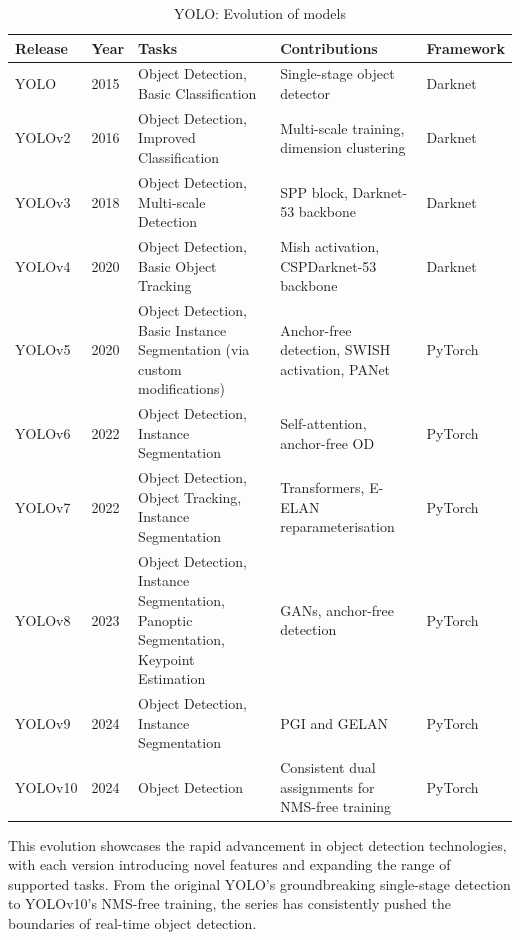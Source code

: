 \documentclass{article}
\begin{document}
\begin{table}[ht]
\centering
\caption{YOLO: Evolution of models}
\label{tab:yolo_versions}
\begin{tabular}{|l|l|p{5cm}|p{5cm}|l|}
\hline
Release & Year & Tasks & Contributions & Framework \\
\hline
YOLO \cite{redmon2016you} & 2015 & Object Detection, Basic Classification & Single-stage object detector & Darknet \\
YOLOv2 \cite{redmon2017yolo9000} & 2016 & Object Detection, Improved Classification & Multi-scale training, dimension clustering & Darknet \\
YOLOv3 \cite{redmon2018yolov3} & 2018 & Object Detection, Multi-scale Detection & SPP block, Darknet-53 backbone & Darknet \\
YOLOv4 \cite{bochkovskiy2020yolov4} & 2020 & Object Detection, Basic Object Tracking & Mish activation, CSPDarknet-53 backbone & Darknet \\
YOLOv5 \cite{yolov5_blog} & 2020 & Object Detection, Basic Instance Segmentation (via custom modifications) & Anchor-free detection, SWISH activation, PANet & PyTorch \\
YOLOv6 \cite{li2022yolov6} & 2022 & Object Detection, Instance Segmentation & Self-attention, anchor-free OD & PyTorch \\
YOLOv7 \cite{wang2023yolov7} & 2022 & Object Detection, Object Tracking, Instance Segmentation & Transformers, E-ELAN reparameterisation & PyTorch \\
YOLOv8 \cite{Solawetz2023yolov8} & 2023 & Object Detection, Instance Segmentation, Panoptic Segmentation, Keypoint Estimation & GANs, anchor-free detection & PyTorch \\
YOLOv9 \cite{wang2024yolov9} & 2024 & Object Detection, Instance Segmentation & PGI and GELAN & PyTorch \\
YOLOv10 \cite{wang2024yolov10} & 2024 & Object Detection & Consistent dual assignments for NMS-free training & PyTorch \\
\hline
\end{tabular}
\end{table}

This evolution showcases the rapid advancement in object detection technologies, with each version introducing novel features and expanding the range of supported tasks. From the original YOLO's groundbreaking single-stage detection to YOLOv10's NMS-free training, the series has consistently pushed the boundaries of real-time object detection.
\end{document}
